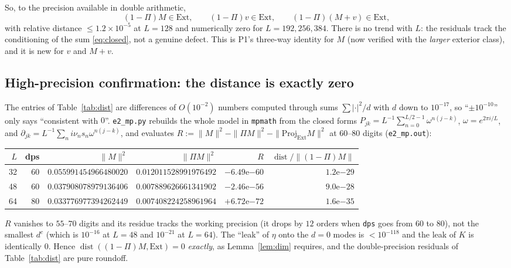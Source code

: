\documentclass[11pt]{article}
\begin{document}
So, to the precision available in double arithmetic,
\begin{equation}\label{eq:inExt}
 (1-\Pi)M\in\mathrm{Ext},\qquad (1-\Pi)v\in\mathrm{Ext},\qquad (1-\Pi)(M+v)\in\mathrm{Ext},
\end{equation}
with relative distance $\le1.2\times10^{-5}$ at $L=128$ and numerically zero for
$L=192,256,384$.  There is no trend with $L$: the residuals track the conditioning of
the sum \eqref{eq:closed}, not a genuine defect.  This is P1's three-way identity for
$M$ (now verified with the \emph{larger} exterior class), and it is new for $v$ and
$M+v$.

\subsection{High-precision confirmation: the distance is exactly zero}
The entries of Table~\ref{tab:dist} are differences of $O(10^{-2})$ numbers computed
through sums $\sum|\cdot|^2/d$ with $d$ down to $10^{-17}$, so ``$\pm10^{-10}$'' only says
``consistent with $0$''.  \texttt{e2\_mp.py} rebuilds the whole model in \texttt{mpmath}
from the closed forms
$P_{jk}=L^{-1}\sum_{n=0}^{L/2-1}\omega^{n(j-k)}$, $\omega=e^{2\pi i/L}$, and
$\partial_{jk}=L^{-1}\sum_n i\nu_ns_n\omega^{n(j-k)}$, and evaluates
$R:=\|M\|^2-\|\Pi M\|^2-\|\mathrm{Proj}_{\mathrm{Ext}}M\|^2$ at $60$--$80$ digits
(\texttt{e2\_mp.out}):
\begin{center}\small
\begin{tabular}{r r r r r r}
\toprule
$L$&dps&$\|M\|^2$&$\|\Pi M\|^2$&$R$&$\operatorname{dist}/\|(1-\Pi)M\|$\\\midrule
32&60&$0.055991454966480020$&$0.012011528991976492$&$-6.49\mathrm{e}{-60}$&$1.2\mathrm{e}{-29}$\\
48&60&$0.037908078979136406$&$0.007889626661341902$&$-2.46\mathrm{e}{-56}$&$9.0\mathrm{e}{-28}$\\
64&80&$0.033776977394262449$&$0.007408224258961964$&$+6.72\mathrm{e}{-72}$&$1.6\mathrm{e}{-35}$\\
\bottomrule
\end{tabular}
\end{center}
$R$ vanishes to $55$--$70$ digits and its residue tracks the working precision (it drops by
$12$ orders when \texttt{dps} goes from $60$ to $80$), not the smallest $d^c$ (which is
$10^{-16}$ at $L=48$ and $10^{-21}$ at $L=64$).  The ``leak'' of $\eta$ onto the $d=0$
modes is $<10^{-118}$ and the leak of $K$ is identically $0$.  Hence
$\operatorname{dist}((1-\Pi)M,\mathrm{Ext})=0$ \emph{exactly}, as Lemma~\ref{lem:dim}
requires, and the double-precision residuals of Table~\ref{tab:dist} are pure roundoff.
\end{document}
